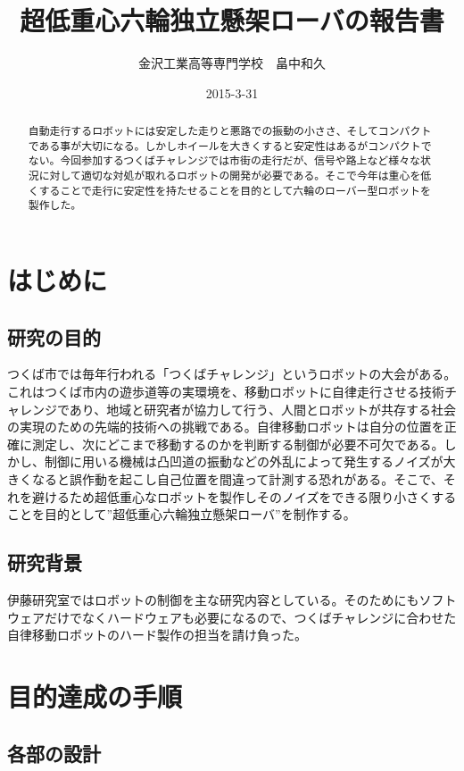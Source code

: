 \documentclass[11pt]{jsarticle}
\title{超低重心六輪独立懸架ローバの報告書}
\author{金沢工業高等専門学校　畠中和久}
\date{2015-3-31}
\begin{document}
\maketitle
\begin{abstract}
自動走行するロボットには安定した走りと悪路での振動の小ささ、そしてコンパクトである事が大切になる。しかしホイールを大きくすると安定性はあるがコンパクトでない。今回参加するつくばチャレンジでは市街の走行だが、信号や路上など様々な状況に対して適切な対処が取れるロボットの開発が必要である。そこで今年は重心を低くすることで走行に安定性を持たせることを目的として六輪のローバー型ロボットを製作した。
\end{abstract}

\tableofcontents
\section{はじめに}
\subsection{研究の目的}
つくば市では毎年行われる「つくばチャレンジ」というロボットの大会がある。これはつくば市内の遊歩道等の実環境を、移動ロボットに自律走行させる技術チャレンジであり、地域と研究者が協力して行う、人間とロボットが共存する社会の実現のための先端的技術への挑戦である。自律移動ロボットは自分の位置を正確に測定し、次にどこまで移動するのかを判断する制御が必要不可欠である。しかし、制御に用いる機械は凸凹道の振動などの外乱によって発生するノイズが大きくなると誤作動を起こし自己位置を間違って計測する恐れがある。そこで、それを避けるため超低重心なロボットを製作しそのノイズをできる限り小さくすることを目的として”超低重心六輪独立懸架ローバ”を制作する。
\subsection{研究背景}
伊藤研究室ではロボットの制御を主な研究内容としている。そのためにもソフトウェアだけでなくハードウェアも必要になるので、つくばチャレンジに合わせた自律移動ロボットのハード製作の担当を請け負った。
\section{目的達成の手順}
\subsection{各部の設計}
\end{document}

